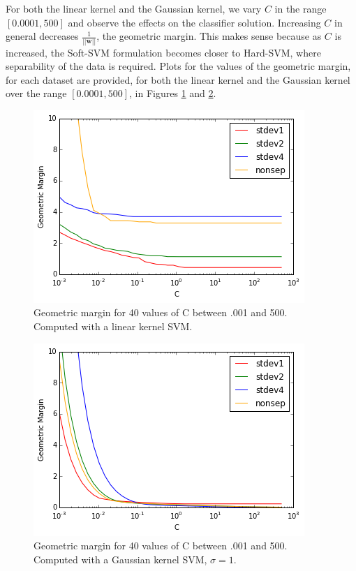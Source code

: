 \documentclass[10pt]{article}
\begin{document}
For both the linear kernel and the Gaussian kernel, we vary $C$ in the range $[0.0001, 500]$ and observe the effects on the classifier solution.  Increasing $C$ in general decreases $\frac{1}{||\mathbf{w}||}$, the geometric margin.  This makes sense because as $C$ is increased, the Soft-SVM formulation becomes closer to Hard-SVM, where separability of the data is required.  Plots for the values of the geometric margin, for each dataset are provided, for both the linear kernel and the Gaussian kernel over the range $[0.0001, 500]$, in Figures \ref{geom_lin} and \ref{geom_gauss}.
\begin{figure}
\centering
\includegraphics[scale=0.5]{geom_lin.png}
\caption{Geometric margin for 40 values of C between .001 and 500.  Computed with a linear kernel SVM.}
\label{geom_lin}
\end{figure}

\begin{figure}
\centering
\includegraphics[scale=0.5]{geom_gauss.png}
\caption{Geometric margin for 40 values of C between .001 and 500.  Computed with a Gaussian kernel SVM, $\sigma=1$.}
\label{geom_gauss}
\end{figure}
\end{document}
